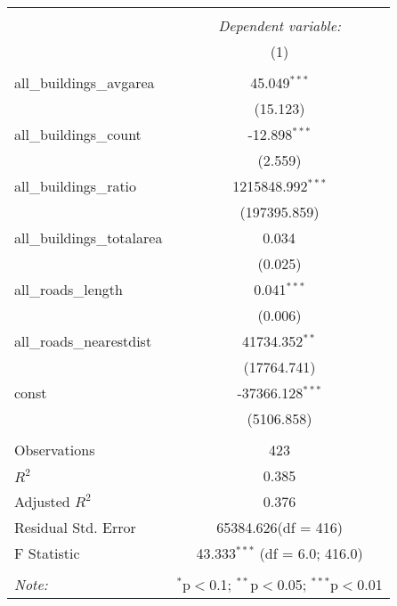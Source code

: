 \begin{table}[!htbp] \centering
\begin{tabular}{@{\extracolsep{5pt}}lc}
\\[-1.8ex]\hline
\hline \\[-1.8ex]
& \multicolumn{1}{c}{\textit{Dependent variable:}} \
\cr \cline{1-2}
\\[-1.8ex] & (1) \\
\hline \\[-1.8ex]
 all_buildings_avgarea & 45.049$^{***}$ \\
  & (15.123) \\
 all_buildings_count & -12.898$^{***}$ \\
  & (2.559) \\
 all_buildings_ratio & 1215848.992$^{***}$ \\
  & (197395.859) \\
 all_buildings_totalarea & 0.034$^{}$ \\
  & (0.025) \\
 all_roads_length & 0.041$^{***}$ \\
  & (0.006) \\
 all_roads_nearestdist & 41734.352$^{**}$ \\
  & (17764.741) \\
 const & -37366.128$^{***}$ \\
  & (5106.858) \\
\hline \\[-1.8ex]
 Observations & 423 \\
 $R^2$ & 0.385 \\
 Adjusted $R^2$ & 0.376 \\
 Residual Std. Error & 65384.626(df = 416)  \\
 F Statistic & 43.333$^{***}$ (df = 6.0; 416.0) \\
\hline
\hline \\[-1.8ex]
\textit{Note:} & \multicolumn{1}{r}{$^{*}$p$<$0.1; $^{**}$p$<$0.05; $^{***}$p$<$0.01} \\
\end{tabular}
\end{table}